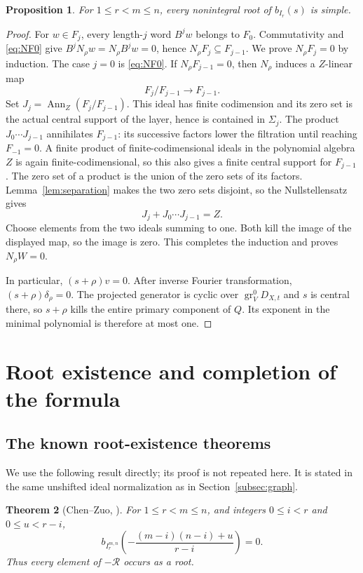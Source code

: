 \documentclass[11pt,a4paper]{article}
\numberwithin{equation}{section}
\newtheorem{theorem}{Theorem}[section]
\newtheorem{proposition}[theorem]{Proposition}
\theoremstyle{definition}
\DeclareMathOperator{\Ann}{Ann}
\DeclareMathOperator{\gr}{gr}
\begin{document}
\begin{proposition}\label{prop:nonintegers}
For $1\le r<m\le n$, every nonintegral root of $b_{I_r}(s)$ is simple.
\end{proposition}
\begin{proof}
For $w\in F_j$, every length-$j$ word $B^jw$ belongs to $F_0$.
Commutativity and \eqref{eq:NF0} give
$B^jN_\rho w=N_\rho B^jw=0$, hence
$N_\rho F_j\subseteq F_{j-1}$. We prove $N_\rho F_j=0$
by induction. The case $j=0$ is \eqref{eq:NF0}. If
$N_\rho F_{j-1}=0$, then $N_\rho$ induces a $Z$-linear map
\[
F_j/F_{j-1}\longrightarrow F_{j-1}.
\]
Set $J_j=\Ann_Z(F_j/F_{j-1})$. This ideal has finite codimension
and its zero set is the actual central support of the layer, hence
is contained in $\Sigma_j$. The product $J_0\cdots J_{j-1}$
annihilates $F_{j-1}$: its successive factors lower the filtration
until reaching $F_{-1}=0$. A finite product of finite-codimensional ideals in the
polynomial algebra $Z$ is again finite-codimensional, so this also
gives a finite central support for $F_{j-1}$. The zero set of a product is the union of the zero
sets of its factors. Lemma~\ref{lem:separation} makes the two zero
sets disjoint, so the Nullstellensatz gives
\[
J_j+J_0\cdots J_{j-1}=Z.
\]
Choose elements from the two ideals summing to one. Both kill the
image of the displayed map, so the image is zero. This completes
the induction and proves $N_\rho W=0$.

In particular, $(s+\rho)v=0$. After inverse Fourier transformation,
$(s+\rho)\delta_\rho=0$. The projected generator is cyclic over
$\gr_V^0D_{X,t}$ and $s$ is central there, so $s+\rho$ kills the
entire primary component of $Q$. Its exponent in the minimal
polynomial is therefore at most one.
\end{proof}

\section{Root existence and completion of the formula}\label{sec:existence}

\subsection{The known root-existence theorems}\label{subsec:knownroots}
We use the following result directly; its proof
is not repeated here. It is stated in the same unshifted ideal
normalization as in Section~\ref{subsec:graph}.

\begin{theorem}[Chen--Zuo, {\cite[Theorem~3.9]{CZ}}]
\label{prop:rootexistence}
For $1\le r<m\le n$, and integers $0\le i<r$ and $0\le u<r-i$,
\[
b_{I_r^{m,n}}\left(-\frac{(m-i)(n-i)+u}{r-i}\right)=0.
\]
Thus every element of $-\mathcal R$ occurs as a root.
\end{theorem}
\end{document}
